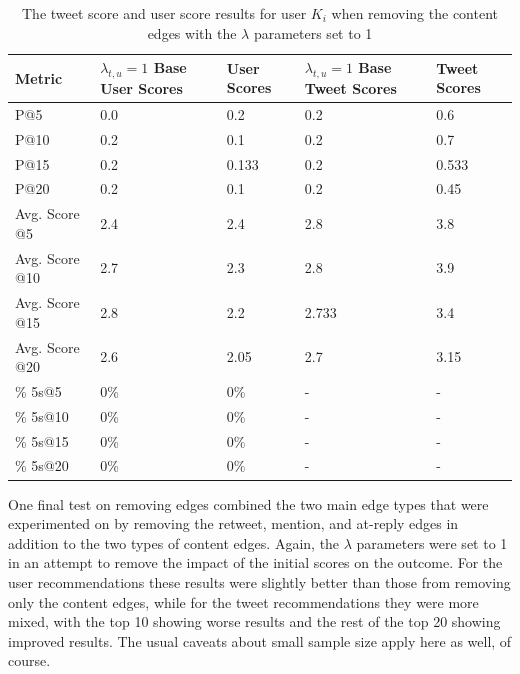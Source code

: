 \begin{table}
\centering
\begin{tabular}{l|p{2cm}|p{2cm}|p{2cm}|p{2cm}}
{\bf Metric} & {\bf $\lambda_{t,u}=1$ Base User Scores} & {\bf User Scores} & {\bf $\lambda_{t,u}=1$ Base Tweet Scores} & {\bf Tweet Scores} \\ \hline
P@5   & 0.0 & 0.2 & 0.2 & 0.6 \\ \hline
P@10 & 0.2 & 0.1 & 0.2 & 0.7 \\ \hline
P@15 & 0.2 & 0.133 & 0.2 & 0.533 \\ \hline
P@20 & 0.2 & 0.1 & 0.2 & 0.45 \\ \hline

Avg. Score @5   & 2.4 & 2.4 & 2.8 & 3.8 \\ \hline
Avg. Score @10 & 2.7 & 2.3 & 2.8 & 3.9 \\ \hline
Avg. Score @15 & 2.8 & 2.2 & 2.733 & 3.4 \\ \hline
Avg. Score @20 & 2.6 & 2.05 & 2.7 & 3.15 \\ \hline

\% 5s@5    & 0\% & 0\% & - & - \\ \hline
\% 5s@10  & 0\% & 0\% & - & - \\ \hline
\% 5s@15  & 0\% & 0\% & - & - \\ \hline
\% 5s@20  & 0\% & 0\% & - & - \\

\end{tabular}
\caption[Results of removing content edges and setting $\lambda$ parameters to 1]{The tweet score and user score results for user $K_{i}$ when removing the content edges with the $\lambda$ parameters set to 1}
\label{tab:RemoveContentLambdasAt1}
\end{table}

One final test on removing edges combined the two main edge types that were experimented on by removing the retweet, mention, and at-reply edges in addition to the two types of content edges. Again, the $\lambda$ parameters were set to 1 in an attempt to remove the impact of the initial scores on the outcome. For the user recommendations these results were slightly better than those from removing only the content edges, while for the tweet recommendations they were more mixed, with the top 10 showing worse results and the rest of the top 20 showing improved results. The usual caveats about small sample size apply here as well, of course.

